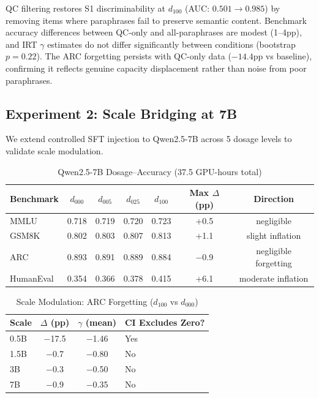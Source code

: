 \documentclass[11pt]{article}
\begin{document}
QC filtering restores S1 discriminability at $d_{100}$ (AUC: $0.501 \to 0.985$) by removing items where paraphrases fail to preserve semantic content. Benchmark accuracy differences between QC-only and all-paraphrases are modest (1--4pp), and IRT $\gamma$ estimates do not differ significantly between conditions (bootstrap $p = 0.22$). The ARC forgetting persists with QC-only data ($-14.4$pp vs baseline), confirming it reflects genuine capacity displacement rather than noise from poor paraphrases.

\subsection{Experiment 2: Scale Bridging at 7B}
\label{sec:7b}

We extend controlled SFT injection to Qwen2.5-7B across 5 dosage levels to validate scale modulation.

\begin{table}[h]
\centering
\caption{Qwen2.5-7B Dosage--Accuracy (37.5 GPU-hours total)}
\label{tab:7b_dosage}
\begin{tabular}{lcccccc}
\toprule
Benchmark & $d_{000}$ & $d_{005}$ & $d_{025}$ & $d_{100}$ & Max $\Delta$ (pp) & Direction \\
\midrule
MMLU & 0.718 & 0.719 & 0.720 & 0.723 & +0.5 & negligible \\
GSM8K & 0.802 & 0.803 & 0.807 & 0.813 & +1.1 & slight inflation \\
ARC & 0.893 & 0.891 & 0.889 & 0.884 & $-$0.9 & negligible forgetting \\
HumanEval & 0.354 & 0.366 & 0.378 & 0.415 & +6.1 & moderate inflation \\
\bottomrule
\end{tabular}
\end{table}

\begin{table}[h]
\centering
\caption{Scale Modulation: ARC Forgetting ($d_{100}$ vs $d_{000}$)}
\label{tab:scale_mod}
\begin{tabular}{lccl}
\toprule
Scale & $\Delta$ (pp) & $\gamma$ (mean) & CI Excludes Zero? \\
\midrule
0.5B & $-$17.5 & $-$1.46 & Yes \\
1.5B & $-$0.7 & $-$0.80 & No \\
3B & $-$0.3 & $-$0.50 & No \\
7B & $-$0.9 & $-$0.35 & No \\
\bottomrule
\end{tabular}
\end{table}
\end{document}
